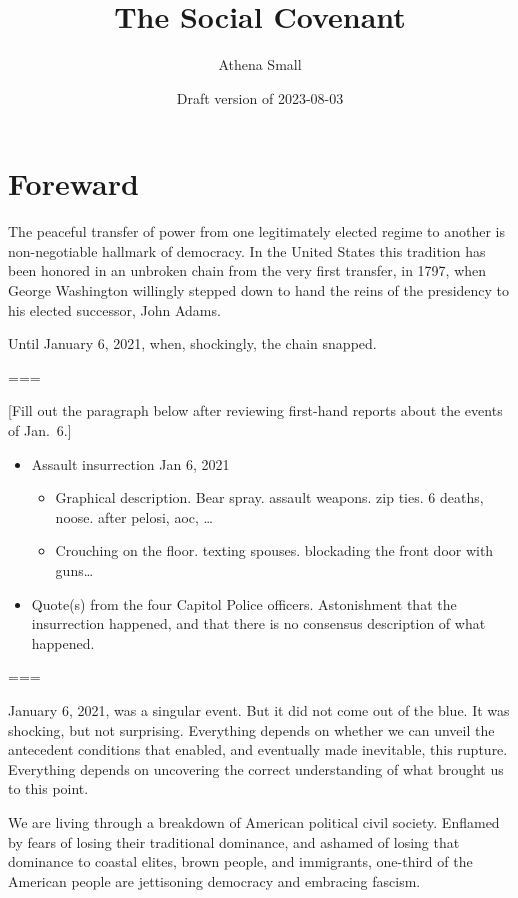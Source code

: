 \documentclass[
]{book}
\title{The Social Covenant}
\author{Athena Small}
\date{Draft version of 2023-08-03}
\providecommand{\tightlist}{%
  \setlength{\itemsep}{0pt}\setlength{\parskip}{0pt}}
\begin{document}
\maketitle

{
\setcounter{tocdepth}{1}
\tableofcontents
}
\hypertarget{foreward}{%
\chapter*{Foreward}\label{foreward}}

The peaceful transfer of power from one legitimately elected regime to another is non-negotiable hallmark of democracy. In the United States this tradition has been honored in an unbroken chain from the very first transfer, in 1797, when George Washington willingly stepped down to hand the reins of the presidency to his elected successor, John Adams.

Until January 6, 2021, when, shockingly, the chain snapped.

===

{[}Fill out the paragraph below after reviewing first-hand reports about the events of Jan.~6.{]}

\begin{itemize}
\tightlist
\item
  Assault insurrection Jan 6, 2021

  \begin{itemize}
  \tightlist
  \item
    Graphical description. Bear spray. assault weapons. zip ties. 6 deaths, noose. after pelosi, aoc, \ldots{}
  \item
    Crouching on the floor. texting spouses. blockading the front door with guns\ldots{}
  \end{itemize}
\item
  Quote(s) from the four Capitol Police officers. Astonishment that the insurrection happened, and that there is no consensus description of what happened.
\end{itemize}

===

January 6, 2021, was a singular event. But it did not come out of the blue. It was shocking, but not surprising. Everything depends on whether we can unveil the antecedent conditions that enabled, and eventually made inevitable, this rupture. Everything depends on uncovering the correct understanding of what brought us to this point.

We are living through a breakdown of American political civil society. Enflamed by fears of losing their traditional dominance, and ashamed of losing that dominance to coastal elites, brown people, and immigrants, one-third of the American people are jettisoning democracy and embracing fascism.
\end{document}
